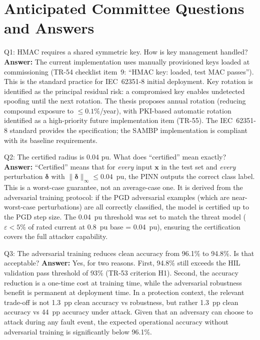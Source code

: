 \documentclass[12pt,a4paper]{article}
\begin{document}
\section{Anticipated Committee Questions and Answers}

\begin{keybox}{Q1: HMAC requires a shared symmetric key. How is key management handled?}
\textbf{Answer:} The current implementation uses manually provisioned keys loaded at commissioning (TR-54 checklist item~9: ``HMAC key: loaded, test MAC passes''). This is the standard practice for IEC~62351-8 initial deployment. Key rotation is identified as the principal residual risk: a compromised key enables undetected spoofing until the next rotation. The thesis proposes annual rotation (reducing compound exposure to $\leq 0.1\%$/year), with PKI-based automatic rotation identified as a high-priority future implementation item (TR-55). The IEC~62351-8 standard provides the specification; the SAMBP implementation is compliant with its baseline requirements.
\end{keybox}

\begin{keybox}{Q2: The certified radius is 0.04 pu. What does ``certified'' mean exactly?}
\textbf{Answer:} ``Certified'' means that for \textit{every} input $\mathbf{x}$ in the test set and \textit{every} perturbation $\bm{\delta}$ with $\|\bm{\delta}\|_\infty \leq 0.04$~pu, the PINN outputs the correct class label. This is a worst-case guarantee, not an average-case one. It is derived from the adversarial training protocol: if the PGD adversarial examples (which are near-worst-case perturbations) are all correctly classified, the model is certified up to the PGD step size. The 0.04~pu threshold was set to match the threat model ($\varepsilon < 5\%$ of rated current at 0.8~pu base = 0.04~pu), ensuring the certification covers the full attacker capability.
\end{keybox}

\begin{keybox}{Q3: The adversarial training reduces clean accuracy from 96.1\% to 94.8\%. Is that acceptable?}
\textbf{Answer:} Yes, for two reasons. First, 94.8\% still exceeds the HIL validation pass threshold of 93\% (TR-53 criterion H1). Second, the accuracy reduction is a one-time cost at training time, while the adversarial robustness benefit is permanent at deployment time. In a protection context, the relevant trade-off is not 1.3~pp clean accuracy vs robustness, but rather 1.3~pp clean accuracy vs 44~pp accuracy under attack. Given that an adversary can choose to attack during any fault event, the expected operational accuracy without adversarial training is significantly below 96.1\%.
\end{keybox}
\end{document}
